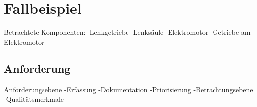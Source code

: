 \chapter{Fallbeispiel}
\label{cha:Fallbeispiel}

Betrachtete Komponenten:
-Lenkgetriebe
-Lenksäule
-Elektromotor
-Getriebe am Elektromotor



\section{Anforderung}
\label{cha:Anforderung}
Anforderungsebene
-Erfassung
-Dokumentation
-Priorisierung
-Betrachtungsebene
-Qualitätsmerkmale

